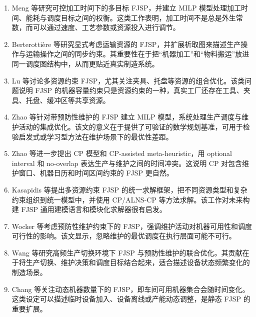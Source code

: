 \documentclass[UTF8,a4paper,11pt]{ctexart}
\begin{document}
\begin{enumerate}[label=\textbf{M\arabic*.},leftmargin=3em]
\item Meng 等研究可控加工时间下的多目标 FJSP，并建立 MILP 模型处理加工时间、能耗与调度目标之间的权衡\cite{Meng2023CPT}。这类工作表明，加工时间不是总是外生常数，而可以通过速度、工艺参数或资源投入进行调节。

\item Berterotti\`ere 等研究显式考虑运输资源的 FJSP，并扩展析取图来描述生产操作与运输操作之间的同步约束\cite{Berterottiere2024Transport}。其重要性在于把“机器加工”和“物料搬运”放进同一调度图结构中，从而更贴近真实制造系统。

\item Lu 等讨论多资源约束 FJSP，尤其关注夹具、托盘等资源的组合优化\cite{Lu2024MultiResource}。该类问题说明 FJSP 的机器容量约束只是资源约束的一种，真实工厂还存在工具、夹具、托盘、缓冲区等共享资源。

\item Zhao 等针对带预防性维护的 FJSP 建立 MILP 模型，系统处理生产调度与维护活动的集成优化\cite{Zhao2025MILPPM}。该文的意义在于提供了可验证的数学规划基准，可用于检验启发式或学习型方法在维护场景下的最优性差距。

\item Zhao 等进一步提出 CP 模型和 CP-assisted meta-heuristic，用 optional interval 和 no-overlap 表达生产与维护之间的时间冲突\cite{Zhao2025CPPM}。这说明 CP 对包含维护窗口、机器日历和时间区间约束的 FJSP 更自然。

\item Kasapidis 等提出多资源约束 FJSP 的统一求解框架，把不同资源类型和复杂约束组织到统一模型中，并使用 CP/ALNS-CP 等方法求解\cite{Kasapidis2025Unified}。该工作对未来构建 FJSP 通用建模语言和模块化求解器很有启发。

\item Wocker 等考虑预防性维护约束下的 FJSP，强调维护活动对机器可用性和调度可行性的影响\cite{Wocker2024PM}。该文显示，忽略维护的最优调度在执行层面可能不可行。

\item Wang 等研究高频生产切换环境下 FJSP 与预防性维护的联合优化\cite{Wang2024PM}。其贡献在于将生产切换、维护决策和调度目标结合起来，适合描述设备状态频繁变化的制造场景。

\item Chang 等关注动态机器数量下的 FJSP，即车间可用机器集合会随时间变化\cite{Chang2024DynamicMachines}。这类设定可以描述临时设备加入、设备离线或产能动态调整，是静态 FJSP 的重要扩展。
\end{enumerate}
\end{document}
